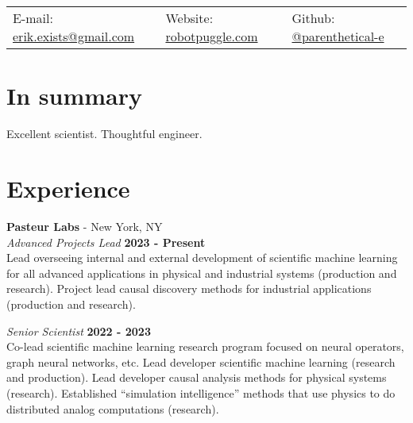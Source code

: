 \documentclass[margin,line]{res}
\begin{document}
\newcommand{\link}[1]{\texttt{#1}}
\providecommand{\tightlist}{%
    \setlength{\itemsep}{0pt}\setlength{\parskip}{0pt}}



\begin{resume}
\section{\sc }
\vspace{.05in}

\begin{tabular}{@{}p{2in}p{2in}p{2in}}
{E-mail:}  {\href{mailto:erik.exists@gmail.com}{erik.exists@gmail.com}} & {Website:} \href{http://robotpuggle.com}{robotpuggle.com} & {Github:} \href{https://github.com/parenthetical-e/}{@parenthetical-e} \\
\end{tabular}

\vspace{-.2cm}
\section{\sc In summary}
Excellent scientist. Thoughtful engineer. 

\section{\sc Experience}
\vspace{-.1cm}
{\bf Pasteur Labs} - New York, NY\\
{\em Advanced Projects Lead} \hfill {\bf 2023 - Present}\\
Lead overseeing internal and external development of scientific machine learning for all advanced applications in physical and industrial systems (production and research). Project lead causal discovery methods for industrial applications (production and research). 

\vspace{-.2cm}
{\em Senior Scientist} \hfill {\bf 2022 - 2023}\\
Co-lead scientific machine learning research program focused on neural operators, graph neural networks, etc. Lead developer scientific machine learning (research and production). Lead developer causal analysis methods for physical systems (research). Established “simulation intelligence” methods that use physics to do distributed analog computations (research). 


\end{resume}
\end{document}
